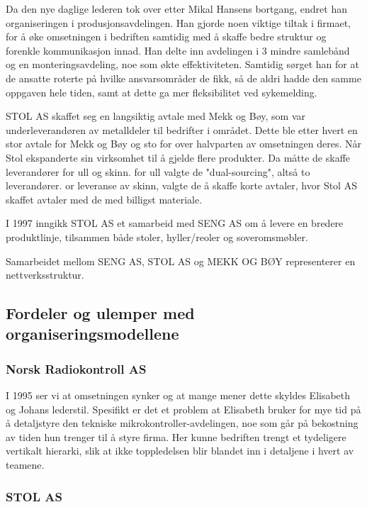 Da den nye daglige lederen tok over etter Mikal Hansens bortgang, endret han organiseringen i produsjonsavdelingen.
Han gjorde noen viktige tiltak i firmaet, for å øke omsetningen i bedriften samtidig med å skaffe bedre struktur og forenkle kommunikasjon innad.
Han delte inn avdelingen i 3 mindre samlebånd og en monteringsavdeling, noe som økte effektiviteten. Samtidig sørget han for at de ansatte roterte på hvilke ansvarsområder de fikk, så de aldri hadde den samme oppgaven hele tiden, samt at dette ga mer fleksibilitet ved sykemelding.

STOL AS skaffet seg en langsiktig avtale med Mekk og Bøy, som var underleverandøren av metalldeler til bedrifter i området. Dette ble etter hvert en stor avtale for Mekk og Bøy og sto for over halvparten av omsetningen deres. Når Stol ekspanderte sin virksomhet til å gjelde flere produkter. Da måtte de skaffe leverandører for ull og skinn. for ull valgte de "dual-sourcing", altså to leverandører. or leveranse av skinn, valgte de å skaffe korte avtaler, hvor Stol AS skaffet avtaler med de med billigst materiale.

I 1997 inngikk STOL AS et samarbeid med SENG AS om å levere en bredere produktlinje, tilsammen både stoler, hyller/reoler og soveromsmøbler.

Samarbeidet mellom SENG AS, STOL AS og MEKK OG BØY representerer en nettverksstruktur.

\subsection{Fordeler og ulemper med organiseringsmodellene}

\subsubsection{Norsk Radiokontroll AS}

I 1995 ser vi at omsetningen synker og at mange mener dette skyldes Elisabeth og Johans lederstil. Spesifikt er det et problem at Elisabeth bruker for mye tid på å detaljstyre den tekniske mikrokontroller-avdelingen, noe som går på bekostning av tiden hun trenger til å styre firma.
Her kunne bedriften trengt et tydeligere vertikalt hierarki, slik at ikke toppledelsen blir blandet inn i detaljene i hvert av teamene.

\subsubsection{STOL AS}

